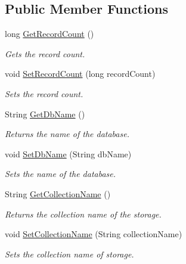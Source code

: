 \subsection*{Public Member Functions}
\begin{DoxyCompactItemize}
\item 
long \hyperlink{classcom_1_1shephertz_1_1app42_1_1paas_1_1sdk_1_1csharp_1_1storage_1_1_storage_aec4d53a6a862e11adb93a2f637d44772}{Get\+Record\+Count} ()
\begin{DoxyCompactList}\small\item\em Gets the record count. \end{DoxyCompactList}\item 
void \hyperlink{classcom_1_1shephertz_1_1app42_1_1paas_1_1sdk_1_1csharp_1_1storage_1_1_storage_af11241c914b51e4449c9ce753c787a97}{Set\+Record\+Count} (long record\+Count)
\begin{DoxyCompactList}\small\item\em Sets the record count. \end{DoxyCompactList}\item 
String \hyperlink{classcom_1_1shephertz_1_1app42_1_1paas_1_1sdk_1_1csharp_1_1storage_1_1_storage_aab58ec9df7eb104fd21f9bea2f69d88f}{Get\+Db\+Name} ()
\begin{DoxyCompactList}\small\item\em Returns the name of the database. \end{DoxyCompactList}\item 
void \hyperlink{classcom_1_1shephertz_1_1app42_1_1paas_1_1sdk_1_1csharp_1_1storage_1_1_storage_ab33d9199352bc742b765a944082525b9}{Set\+Db\+Name} (String db\+Name)
\begin{DoxyCompactList}\small\item\em Sets the name of the database. \end{DoxyCompactList}\item 
String \hyperlink{classcom_1_1shephertz_1_1app42_1_1paas_1_1sdk_1_1csharp_1_1storage_1_1_storage_af47eee087ad17a6ea8ef80eef23eef54}{Get\+Collection\+Name} ()
\begin{DoxyCompactList}\small\item\em Returns the collection name of the storage. \end{DoxyCompactList}\item 
void \hyperlink{classcom_1_1shephertz_1_1app42_1_1paas_1_1sdk_1_1csharp_1_1storage_1_1_storage_a208db73494e8144e598f2f70fb6af712}{Set\+Collection\+Name} (String collection\+Name)
\begin{DoxyCompactList}\small\item\em Sets the collection name of storage. \end{DoxyCompactList}\item 

\end{DoxyCompactItemize}
